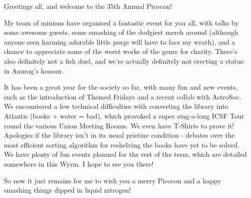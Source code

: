Greetings all, and welcome to the 35th Annual Picocon!

My team of minions have organised a fantastic event for you all, with talks by some awesome guests, some smashing of the dodgiest merch around (although anyone seen harming adorable little porgs will have to face my wrath), and a chance to appreciate some of the worst works of the genre for charity. There's also definitely not a fish duel, and we're actually definitely not erecting a statue in Anurag's honour. 

It has been a great year for the society so far, with many fun and new events, such as the introduction of Themed Fridays and a recent collab with AstroSoc. We encountered a few technical difficulties with converting the library into Atlantis (books + water = bad), which provoked a super sing-a-long ICSF Tour round the various Union Meeting Rooms. We even have T-Shirts to prove it! Apologies if the library isn't in its usual pristine condition - debates over the most efficient sorting algorithm for reshelving the books have yet to be solved. We have plenty of fun events planned for the rest of the term, which are detailed somewhere in this Wyrm. I hope to see you there!

So now it just remains for me to wish you a merry Picocon and a happy smashing things dipped in liquid nitrogen!